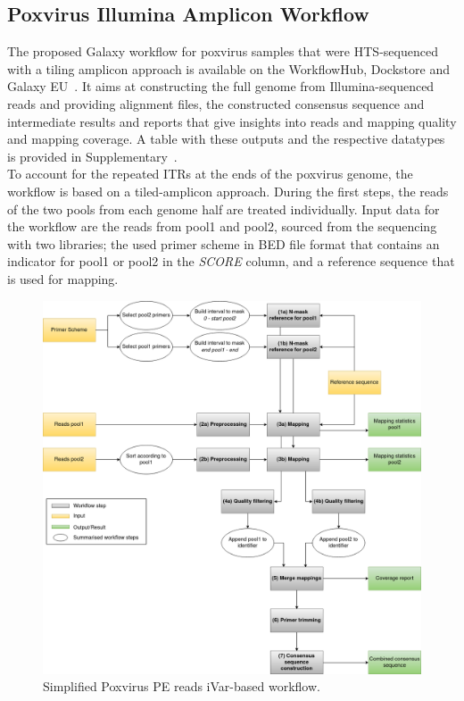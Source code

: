 \subsection{Poxvirus Illumina Amplicon Workflow}\label{sec:pox-wf}
The proposed Galaxy workflow for poxvirus samples that were \ac{HTS}-sequenced with a tiling amplicon approach is available on the WorkflowHub, Dockstore and Galaxy EU~. It aims at constructing the full genome from Illumina-sequenced reads and providing alignment files, the constructed consensus sequence and intermediate results and reports that give insights into reads and mapping quality and mapping coverage. A table with these outputs and the respective datatypes is provided in Supplementary~. \\
To account for the repeated \acp{ITR} at the ends of the poxvirus genome, the workflow is based on a tiled-amplicon approach. During the first steps, the reads of the two pools from each genome half are treated individually. Input data for the workflow are the reads from pool1 and pool2, sourced from the sequencing with two libraries; the used primer scheme in \ac{BED} file format that contains an indicator for pool1 or pool2 in the \textit{SCORE} column, and a reference sequence that is used for mapping. 

\begin{figure}[ht!]
	\includegraphics[width=1\textwidth]{media/pox.png}
	\caption{Simplified Poxvirus PE reads iVar-based workflow.}
	\label{fig:3-pox-wf}
\end{figure}

